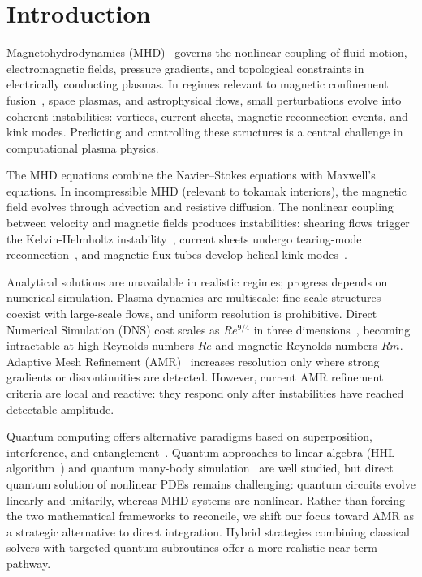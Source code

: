 \documentclass[12pt, a4paper, oneside]{report}
\begin{document}
\tableofcontents

\chapter{Introduction}
\label{chap:introduction}

Magnetohydrodynamics (MHD)~\cite{freidberg2014,goedbloed2004} governs the nonlinear coupling of fluid motion, electromagnetic fields, pressure gradients, and topological constraints in electrically conducting plasmas. In regimes relevant to magnetic confinement fusion~\cite{wesson2011}, space plasmas, and astrophysical flows, small perturbations evolve into coherent instabilities: vortices, current sheets, magnetic reconnection events, and kink modes. Predicting and controlling these structures is a central challenge in computational plasma physics.

The MHD equations combine the Navier--Stokes equations with Maxwell's equations. In incompressible MHD (relevant to tokamak interiors), the magnetic field evolves through advection and resistive diffusion. The nonlinear coupling between velocity and magnetic fields produces instabilities: shearing flows trigger the Kelvin-Helmholtz instability~\cite{chandrasekhar1961}, current sheets undergo tearing-mode reconnection~\cite{furth1963}, and magnetic flux tubes develop helical kink modes~\cite{bateman1978}.

Analytical solutions are unavailable in realistic regimes; progress depends on numerical simulation. Plasma dynamics are multiscale: fine-scale structures coexist with large-scale flows, and uniform resolution is prohibitive. Direct Numerical Simulation (DNS) cost scales as $Re^{9/4}$ in three dimensions~\cite{pope2000}, becoming intractable at high Reynolds numbers $Re$ and magnetic Reynolds numbers $Rm$. Adaptive Mesh Refinement (AMR)~\cite{berger1984,berger1989} increases resolution only where strong gradients or discontinuities are detected. However, current AMR refinement criteria are local and reactive: they respond only after instabilities have reached detectable amplitude.

Quantum computing offers alternative paradigms based on superposition, interference, and entanglement~\cite{nielsen2010}. Quantum approaches to linear algebra (HHL algorithm~\cite{harrow2009}) and quantum many-body simulation~\cite{feynman1982} are well studied, but direct quantum solution of nonlinear PDEs remains challenging: quantum circuits evolve linearly and unitarily, whereas MHD systems are nonlinear. Rather than forcing the two mathematical frameworks to reconcile, we shift our focus toward AMR as a strategic alternative to direct integration. Hybrid strategies combining classical solvers with targeted quantum subroutines offer a more realistic near-term pathway.
\end{document}
